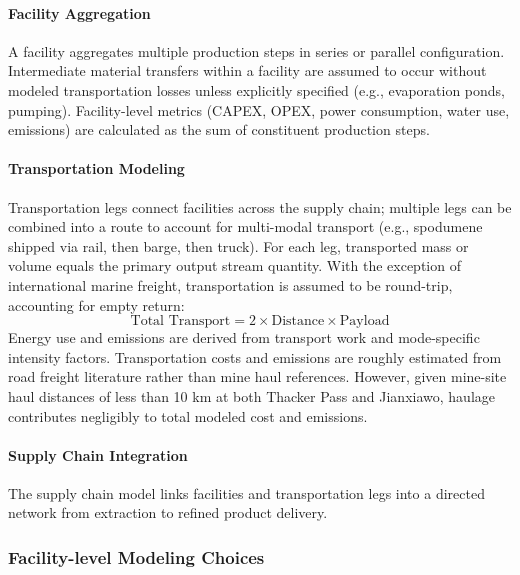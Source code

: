 \paragraph{Facility Aggregation}\label{app:04-methods-system-facilities}

A facility aggregates multiple production steps in series or parallel configuration. Intermediate material transfers within a facility are assumed to occur without modeled transportation losses unless explicitly specified (e.g., evaporation ponds, pumping). Facility-level metrics (CAPEX, OPEX, power consumption, water use, emissions) are calculated as the sum of constituent production steps.

\paragraph{Transportation Modeling}\label{app:04-methods-system-transport}

Transportation legs connect facilities across the supply chain; multiple legs can be combined into a route to account for multi-modal transport (e.g., spodumene shipped via rail, then barge, then truck). For each leg, transported mass or volume equals the primary output stream quantity. With the exception of international marine freight, transportation is assumed to be round-trip, accounting for empty return:
\begin{equation}
    \text{Total Transport} = 2 \times \text{Distance} \times \text{Payload}
\end{equation}
Energy use and emissions are derived from transport work and mode-specific intensity factors. Transportation costs and emissions are roughly estimated from road freight literature \cite{mulhollandCO2EmissionsTrucks2023} rather than mine haul references. However, given mine-site haul distances of less than 10 km at both Thacker Pass and Jianxiawo, haulage contributes negligibly to total modeled cost and emissions. 

\paragraph{Supply Chain Integration}\label{app:04-methods-system-sc}

The supply chain model links facilities and transportation legs into a directed network from extraction to refined product delivery.

\clearpage
\subsubsection{Facility-level Modeling Choices}\label{app:04-methods-facilitychoices}

